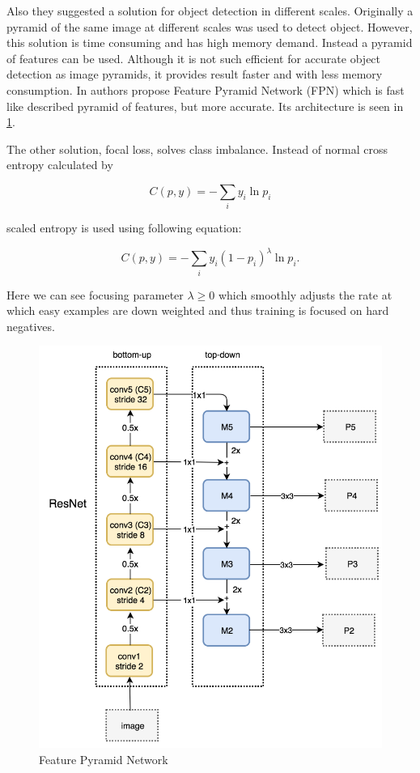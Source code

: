 \documentclass[twoside]{ctuthesis}
\theoremstyle{plain}
\theoremstyle{definition}
\theoremstyle{note}
\begin{document}
Also they suggested a solution for object detection in different scales. Originally a pyramid of the same image at different scales was used to detect object. However, this solution is time consuming and has high memory demand. Instead a pyramid of features can be used. Although it is not such efficient for accurate object detection as image pyramids, it provides result faster and with less memory consumption. In \cite{lin_dollar_girshick_he_hariharan_belongie_2017} authors propose Feature Pyramid Network (FPN) which is fast like described pyramid of features, but more accurate. Its architecture is seen in \ref{fpn}.

The other solution, focal loss, solves class imbalance. Instead of normal cross entropy calculated by 

\begin{equation}
C(p, y) = -\sum_{i}y_i \ln p_i
\end{equation}  


scaled entropy is used using following equation:

\begin{equation}
C(p,y)=-\sum_i y_i(1-p_i)^{\lambda}\ln p_i.
\end{equation}

Here we can see focusing parameter $\lambda \geq 0$ which smoothly adjusts the rate at which easy examples are down weighted and thus training is focused on hard negatives. 



\begin{figure}[h]
\caption{Feature Pyramid Network}
\label{fpn}
\includegraphics[width=\textwidth]{images/used_networks/fpn.png}
\end{figure}
\end{document}

